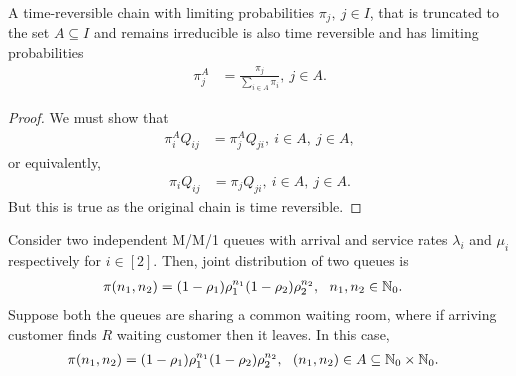 \documentclass[a4paper,10pt,english]{article}
\begin{document}
\begin{prop}
A time-reversible chain with limiting probabilities $\pi_j,~ j \in I$, that is truncated to the set $A\subseteq I$ and remains irreducible is also time reversible and has limiting probabilities 
\begin{align*}
\pi_j^A&=\frac{\pi_j}{\sum_{i \in A}\pi_i},~ j \in A.
\end{align*}
\end{prop}
\begin{proof}
We must show that 
\begin{align*}
\pi_i^AQ_{ij}&=\pi_j^AQ_{ji},~ i \in A,~ j \in A,
\end{align*}
or equivalently,
\begin{align*} 
\pi_iQ_{ij}&=\pi_jQ_{ji},~ i \in A,~ j \in A.
\end{align*}
But this is true as the original chain is time reversible.
\end{proof}
\begin{exmp} Consider two independent M/M/1 queues with arrival and service rates $\lambda_i$ and $\mu_i$ respectively for $i \in [2]$. Then, joint distribution of two queues is
\begin{align*}
\pi(n_1,n_2) &= (1 -\rho_1)\rho_1^{n_1}(1-\rho_2)\rho_2^{n_2},~~n_1,n_2 \in \mathbb{N}_0. 
\end{align*}
Suppose both the queues are sharing a common waiting room, where if arriving customer finds $R$ waiting customer then it leaves. In this case,
\begin{align*}
\pi(n_1,n_2) &= (1 -\rho_1)\rho_1^{n_1}(1-\rho_2)\rho_2^{n_2},~~(n_1,n_2) \in A \subseteq \mathbb{N}_0\times\mathbb{N}_0. 
\end{align*}
\end{exmp}
\end{document}
